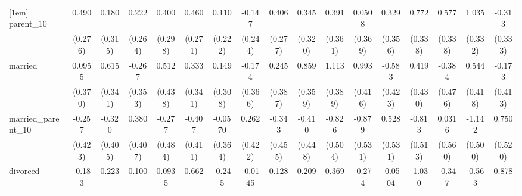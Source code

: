{\begin{tabular}{l*{16}{c}}
[1em]
parent\_10           &       0.490         &       0.180         &       0.222         &       0.400         &       0.460         &       0.110         &      -0.147         &       0.406         &       0.345         &       0.391         &      0.0508         &       0.329         &       0.772\sym{*}  &       0.577         &       1.035\sym{**} &      -0.313         \\
                    &     (0.276)         &     (0.315)         &     (0.264)         &     (0.298)         &     (0.271)         &     (0.222)         &     (0.244)         &     (0.277)         &     (0.320)         &     (0.361)         &     (0.369)         &     (0.356)         &     (0.338)         &     (0.338)         &     (0.332)         &     (0.333)         \\
[1em]
married             &      0.0955         &       0.615         &      -0.267         &       0.512         &       0.333         &       0.149         &      -0.174         &       0.245         &       0.859\sym{*}  &       1.113\sym{**} &       0.993\sym{*}  &      -0.583         &       0.419         &      -0.384         &       0.544         &      -0.173         \\
                    &     (0.370)         &     (0.341)         &     (0.353)         &     (0.438)         &     (0.341)         &     (0.308)         &     (0.366)         &     (0.387)         &     (0.359)         &     (0.389)         &     (0.416)         &     (0.423)         &     (0.430)         &     (0.476)         &     (0.418)         &     (0.413)         \\
[1em]
married\_parent\_10   &      -0.257         &      -0.320         &       0.380         &      -0.277         &      -0.407         &     -0.0570         &       0.262         &      -0.343         &      -0.410         &      -0.826         &      -0.879         &       0.528         &      -0.813         &      0.0316         &      -1.142\sym{*}  &       0.750         \\
                    &     (0.423)         &     (0.405)         &     (0.407)         &     (0.484)         &     (0.411)         &     (0.364)         &     (0.422)         &     (0.455)         &     (0.448)         &     (0.504)         &     (0.531)         &     (0.531)         &     (0.513)         &     (0.560)         &     (0.500)         &     (0.520)         \\
[1em]
divorced            &      -0.183         &       0.223         &       0.100         &      0.0935         &       0.662\sym{*}  &      -0.245         &     -0.0145         &       0.128         &       0.209         &       0.369         &      -0.274         &     -0.0504         &      -1.030\sym{*}  &      -0.347         &      -0.563         &       0.878\sym{*}  \\

\end{tabular}}
